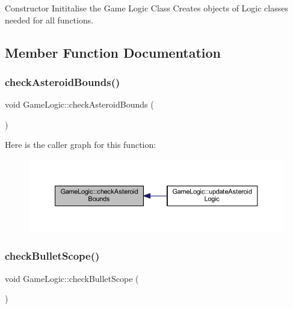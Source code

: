 Constructor Inititalise the Game Logic Class Creates objects of Logic classes needed for all functions. 



\subsection{Member Function Documentation}
\mbox{\label{class_game_logic_a35dcb163c584e620b876def784cbd7a4}} 
\subsubsection{\texorpdfstring{check\+Asteroid\+Bounds()}{checkAsteroidBounds()}}
{\footnotesize\ttfamily void Game\+Logic\+::check\+Asteroid\+Bounds (\begin{DoxyParamCaption}{ }\end{DoxyParamCaption})}

Here is the caller graph for this function\+:\nopagebreak
\begin{figure}[H]
\begin{center}
\leavevmode
\includegraphics[width=350pt]{class_game_logic_a35dcb163c584e620b876def784cbd7a4_icgraph}
\end{center}
\end{figure}
\mbox{\label{class_game_logic_aa0800f256ffc094ee5373d372c26c2ea}} 
\subsubsection{\texorpdfstring{check\+Bullet\+Scope()}{checkBulletScope()}}
{\footnotesize\ttfamily void Game\+Logic\+::check\+Bullet\+Scope (\begin{DoxyParamCaption}{ }\end{DoxyParamCaption})}


